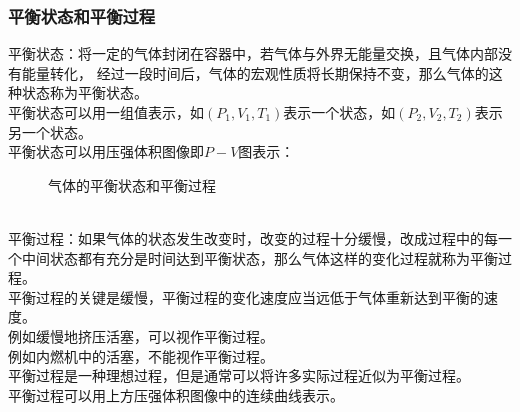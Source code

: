 \documentclass[UTF8]{ctexart}
\begin{document}
\newpage

\subsubsection{平衡状态和平衡过程}
    平衡状态：将一定的气体封闭在容器中，若气体与外界无能量交换，且气体内部没有能量转化，
    经过一段时间后，气体的宏观性质将长期保持不变，那么气体的这种状态称为平衡状态。\\[3mm]
    平衡状态可以用一组值表示，如$(P_1,V_1,T_1)$表示一个状态，如$(P_2,V_2,T_2)$表示另一个状态。\\[3mm]
    平衡状态可以用压强体积图像即$P-V$图表示：\vspace{10pt}
    \begin{figure}[h]
        \begin{center}
            \qquad
            \caption{气体的平衡状态和平衡过程}
        \end{center}
    \end{figure}\\
    平衡过程：如果气体的状态发生改变时，改变的过程十分缓慢，改成过程中的每一个中间状态都有充分是时间达到平衡状态，那么气体这样的变化过程就称为平衡过程。\\[3mm]
    平衡过程的关键是缓慢，平衡过程的变化速度应当远低于气体重新达到平衡的速度。\\[3mm]
    例如缓慢地挤压活塞，可以视作平衡过程。\\[3mm]
    例如内燃机中的活塞，不能视作平衡过程。\\[6mm]
    平衡过程是一种理想过程，但是通常可以将许多实际过程近似为平衡过程。\\[3mm]
    平衡过程可以用上方压强体积图像中的连续曲线表示。
\end{document}
